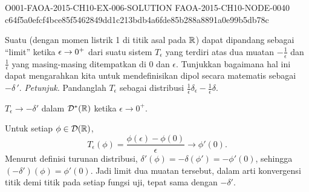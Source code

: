 \begin{o001solution}
  {O001-FAOA-2015-CH10-EX-006-SOLUTION}
  {FAOA-2015-CH10-NODE-0040}
  {c64f5a0efcf4bce85f5462849dd1c213bdb4a6fde85b288a8891a0e99b5db78c}
\begin{o001statement}
Suatu  (dengan momen listrik 1 di titik asal pada $\mathbb{R}$) dapat dipandang sebagai ``limit'' ketika $\epsilon \rightarrow 0^+$
dari suatu sistem $T_\epsilon$ yang terdiri atas dua muatan $-\frac1\epsilon$ dan $\frac1\epsilon$ yang masing-masing ditempatkan di $0$ dan $\epsilon$. Tunjukkan
bagaimana hal ini dapat mengarahkan kita untuk mendefinisikan dipol secara matematis sebagai $-\delta\,'$. \emph{Petunjuk.} Pandanglah $T_\epsilon$ sebagai
distribusi $\frac1\epsilon \delta_\epsilon - \frac1\epsilon \delta$.
\end{o001statement}
\begin{o001answer}
$T_\epsilon\to-\delta'$ dalam $\mathcal{D}^*(\mathbb{R})$ ketika
$\epsilon\to0^+$.
\end{o001answer}
\begin{o001proof}
Untuk setiap $\phi\in\mathcal{D}(\mathbb{R})$,
\[
 T_\epsilon(\phi)
 =\frac{\phi(\epsilon)-\phi(0)}{\epsilon}
 \longrightarrow \phi'(0).
\]
Menurut definisi turunan distribusi,
$\delta'(\phi)=-\delta(\phi')=-\phi'(0)$, sehingga
$(-\delta')(\phi)=\phi'(0)$. Jadi limit dua muatan tersebut, dalam arti
konvergensi titik demi titik pada setiap fungsi uji, tepat sama dengan
$-\delta'$.
\end{o001proof}
\end{o001solution}

